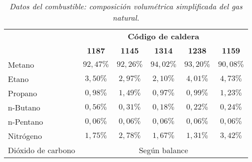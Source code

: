 \begin{table}[ht]
\centering
\begin{tabular}[t]{lccccc}
\toprule
&\multicolumn{5}{c}{\textbf{Código de caldera}}\\
&\textbf{1187} & \textbf{1145} & \textbf{1314} &  \textbf{1238} & \textbf{1159}\\
\midrule
Metano&$92,47\%$&$92,26\%$&$94,02\%$&$93,20\%$&$90,08\%$\\
Etano&$3,50\%$&$2,97\%$&$2,10\%$&$4,01\%$&$4,73\%$\\
Propano&$0,98\%$&$1,49\%$&$0,97\%$&$0,99\%$&$1,23\%$\\
n-Butano&$0,56\%$&$0,31\%$&$0,18\%$&$0,22\%$&$0,24\%$\\
n-Pentano&$0,06\%$&$0,06\%$&$0,06\%$&$0,06\%$&$0,06\%$\\
Nitrógeno&$1,75\%$&$2,78\%$&$1,67\%$&$1,31\%$&$3,42\%$\\
Dióxido de carbono&\multicolumn{5}{c}{Según balance}\\
\bottomrule
\end{tabular}
\caption{\textit{Datos del combustible: composición volumétrica simplificada del gas natural.}}
\label{tab:GN}
\end{table}


